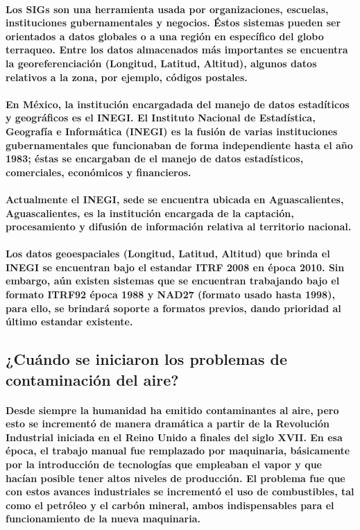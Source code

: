 	\paragraph{Los SIGs son una herramienta usada por organizaciones, escuelas, instituciones gubernamentales y negocios. Éstos sistemas pueden ser orientados a datos globales o a una región en específico del globo terraqueo. Entre los datos almacenados más importantes se encuentra la georeferenciación (Longitud, Latitud, Altitud), algunos datos relativos a la zona, por ejemplo, códigos postales.}
	\paragraph{En México, la institución encargadada del manejo de datos estadíticos y geográficos es el INEGI. El Instituto Nacional de Estadística, Geografía e Informática (INEGI) es la fusión de varias instituciones gubernamentales que funcionaban de forma independiente hasta el año 1983; éstas se encargaban de el manejo de datos estadísticos, comerciales, económicos y financieros.}
	\paragraph{Actualmente el INEGI, sede se encuentra ubicada en Aguascalientes, Aguascalientes, es la institución encargada de la captación, procesamiento y difusión de información relativa al territorio nacional. \cite{6}}
	\paragraph{Los datos geoespaciales (Longitud, Latitud, Altitud) que brinda el INEGI se encuentran bajo el estandar \textbf{ITRF 2008} en época 2010. Sin embargo, aún existen sistemas que se encuentran trabajando bajo el formato ITRF92 época 1988 y NAD27 (formato usado hasta 1998), para ello, se brindará soporte a formatos previos, dando prioridad al último estandar existente.}	
    \subsection{¿Cuándo se iniciaron los problemas de contaminación del aire?}
    \paragraph {Desde siempre la humanidad ha emitido contaminantes al aire, pero esto se incrementó de manera dramática a partir de la Revolución Industrial iniciada en el Reino Unido a finales del siglo XVII. En esa época, el trabajo manual fue remplazado por maquinaria, básicamente por la introducción de tecnologías que empleaban el vapor y que hacían posible tener altos niveles de producción. El problema fue que con estos avances industriales se incrementó el  uso de combustibles, tal como el petróleo y el carbón mineral, ambos indispensables para el funcionamiento de la nueva maquinaria.}

